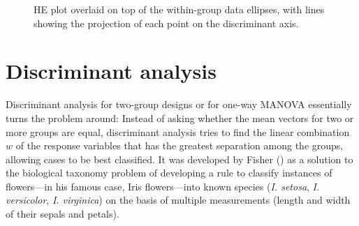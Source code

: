 \documentclass[
  letterpaper,
  10pt,
  krantz2]{krantz}
\makeatletter
\newenvironment{Shaded}{\begin{snugshade}}{\end{snugshade}}
\newcommand{\AttributeTok}[1]{\textcolor[rgb]{0.40,0.45,0.13}{#1}}
\newcommand{\ControlFlowTok}[1]{\textcolor[rgb]{0.00,0.23,0.31}{#1}}
\newcommand{\DecValTok}[1]{\textcolor[rgb]{0.68,0.00,0.00}{#1}}
\newcommand{\FloatTok}[1]{\textcolor[rgb]{0.68,0.00,0.00}{#1}}
\newcommand{\FunctionTok}[1]{\textcolor[rgb]{0.28,0.35,0.67}{#1}}
\newcommand{\NormalTok}[1]{\textcolor[rgb]{0.00,0.23,0.31}{#1}}
\newcommand{\OtherTok}[1]{\textcolor[rgb]{0.00,0.23,0.31}{#1}}
\newcommand{\SpecialCharTok}[1]{\textcolor[rgb]{0.37,0.37,0.37}{#1}}
\newcommand{\StringTok}[1]{\textcolor[rgb]{0.13,0.47,0.30}{#1}}
\newenvironment{kframe}{%
  \medskip{}
  \setlength{\fboxsep}{.8em}
  \def\at@end@of@kframe{}%
  \ifinner\ifhmode%
  \def\at@end@of@kframe{\end{minipage}}%
  \begin{minipage}{\columnwidth}%
  \fi\fi%
  \def\FrameCommand##1{\hskip\@totalleftmargin \hskip-\fboxsep
  \colorbox{shadecolor}{##1}\hskip-\fboxsep
      \hskip-\linewidth \hskip-\@totalleftmargin \hskip\columnwidth}%
  \MakeFramed {\advance\hsize-\width
    \@totalleftmargin\z@ \linewidth\hsize
    \@setminipage}}%
{\par\unskip\endMakeFramed%
  \at@end@of@kframe}
\renewenvironment{Shaded}{\begin{kframe}}{\end{kframe}}
\makeatother
\begin{document}
\begin{Shaded}
\end{Shaded}

\begin{figure}[H]


\caption{\label{fig-mathscore-HE-overlay}HE plot overlaid on top of the
within-group data ellipses, with lines showing the projection of each
point on the discriminant axis.}

\end{figure}%

\section{Discriminant analysis}\label{discriminant-analysis}

Discriminant analysis for two-group designs or for one-way MANOVA
essentially turns the problem around: Instead of asking whether the mean
vectors for two or more groups are equal, discriminant analysis tries to
find the linear combination \(w\) of the response variables that has the
greatest separation among the groups, allowing cases to be best
classified. It was developed by Fisher
() as a solution to the biological
taxonomy problem of developing a rule to classify instances of
flowers---in his famous case, Iris flowers---into known species
(\emph{I. setosa}, \emph{I. versicolor}, \emph{I. virginica}) on the
basis of multiple measurements (length and width of their sepals and
petals).
\end{document}
